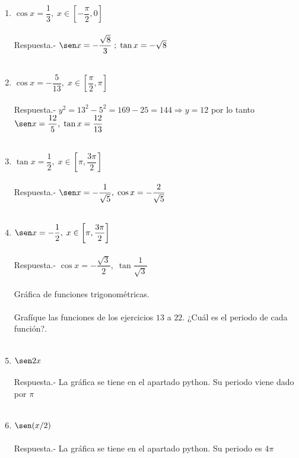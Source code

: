 \begin{enumerate}
\item $\cos x = \dfrac{1}{3}, \; x \in \left[-\dfrac{\pi}{2},0\right]$\\\\
    Respuesta.-\; $\sen x= -\dfrac{\sqrt{8}}{3} \; ; \; \tan x = -\sqrt{8}$\\\\

\item $\cos x = -\dfrac{5}{13},\; x \in \left[\dfrac{\pi}{2},\pi\right]$\\\\
    Respuesta.-\; $ y^2 = 13^2 - 5^2 = 169 - 25 = 144 \Longrightarrow y=12$ por lo tanto $\sen x = \dfrac{12}{5},\; \tan x = \dfrac{12}{13}$\\\\

\item $\tan x = \dfrac{1}{2},\; x \in \left[\pi, \dfrac{3\pi}{2}\right]$\\\\
    Respuesta.-\; $\sen x = -\dfrac{1}{\sqrt{5}},\; \cos x = -\dfrac{2}{\sqrt{5}}$\\\\

\item $\sen x = -\dfrac{1}{2},\; x\in \left[\pi, \dfrac{3\pi}{2}\right]$\\\\
    Respuesta.-\; $\cos x = -\dfrac{\sqrt{3}}{2}, \; \tan \dfrac{1}{\sqrt{3}}$\\\\

Gráfica de funciones trigonométricas.\\\\
Grafíque las funciones de los ejercicios $13$ a $22$. ¿Cuál es el periodo de cada función?.\\\\

\item $\sen 2x$\\\\
    Respuesta.-\; La gráfica se tiene en el apartado python. Su periodo viene dado por $\pi$\\\\

\item $\sen(x/2)$\\\\
    Respuesta.-\; La gráfica se tiene en el apartado python. Su periodo es $4\pi$\\\\


\end{enumerate}
